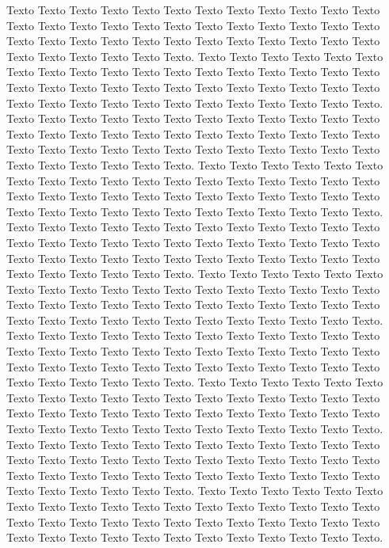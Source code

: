 \paragrafo{}
Texto Texto Texto Texto Texto Texto Texto Texto Texto Texto Texto Texto Texto Texto Texto Texto Texto Texto Texto Texto Texto Texto Texto Texto Texto Texto Texto Texto Texto Texto Texto Texto Texto Texto Texto Texto Texto Texto Texto Texto Texto Texto.
\paragrafo{}
Texto Texto Texto Texto Texto Texto Texto Texto Texto Texto Texto Texto Texto Texto Texto Texto Texto Texto Texto Texto Texto Texto Texto Texto Texto Texto Texto Texto Texto Texto Texto Texto Texto Texto Texto Texto Texto Texto Texto Texto Texto Texto.
\paragrafo{}
Texto Texto Texto Texto Texto Texto Texto Texto Texto Texto Texto Texto Texto Texto Texto Texto Texto Texto Texto Texto Texto Texto Texto Texto Texto Texto Texto Texto Texto Texto Texto Texto Texto Texto Texto Texto Texto Texto Texto Texto Texto Texto.
\paragrafo{}
Texto Texto Texto Texto Texto Texto Texto Texto Texto Texto Texto Texto Texto Texto Texto Texto Texto Texto Texto Texto Texto Texto Texto Texto Texto Texto Texto Texto Texto Texto Texto Texto Texto Texto Texto Texto Texto Texto Texto Texto Texto Texto.
\paragrafo{}
Texto Texto Texto Texto Texto Texto Texto Texto Texto Texto Texto Texto Texto Texto Texto Texto Texto Texto Texto Texto Texto Texto Texto Texto Texto Texto Texto Texto Texto Texto Texto Texto Texto Texto Texto Texto Texto Texto Texto Texto Texto Texto.
\paragrafo{}
Texto Texto Texto Texto Texto Texto Texto Texto Texto Texto Texto Texto Texto Texto Texto Texto Texto Texto Texto Texto Texto Texto Texto Texto Texto Texto Texto Texto Texto Texto Texto Texto Texto Texto Texto Texto Texto Texto Texto Texto Texto Texto.
\paragrafo{}
Texto Texto Texto Texto Texto Texto Texto Texto Texto Texto Texto Texto Texto Texto Texto Texto Texto Texto Texto Texto Texto Texto Texto Texto Texto Texto Texto Texto Texto Texto Texto Texto Texto Texto Texto Texto Texto Texto Texto Texto Texto Texto.
\paragrafo{}
Texto Texto Texto Texto Texto Texto Texto Texto Texto Texto Texto Texto Texto Texto Texto Texto Texto Texto Texto Texto Texto Texto Texto Texto Texto Texto Texto Texto Texto Texto Texto Texto Texto Texto Texto Texto Texto Texto Texto Texto Texto Texto.
\paragrafo{}
Texto Texto Texto Texto Texto Texto Texto Texto Texto Texto Texto Texto Texto Texto Texto Texto Texto Texto Texto Texto Texto Texto Texto Texto Texto Texto Texto Texto Texto Texto Texto Texto Texto Texto Texto Texto Texto Texto Texto Texto Texto Texto.
\paragrafo{}
Texto Texto Texto Texto Texto Texto Texto Texto Texto Texto Texto Texto Texto Texto Texto Texto Texto Texto Texto Texto Texto Texto Texto Texto Texto Texto Texto Texto Texto Texto Texto Texto Texto Texto Texto Texto Texto Texto Texto Texto Texto Texto.
